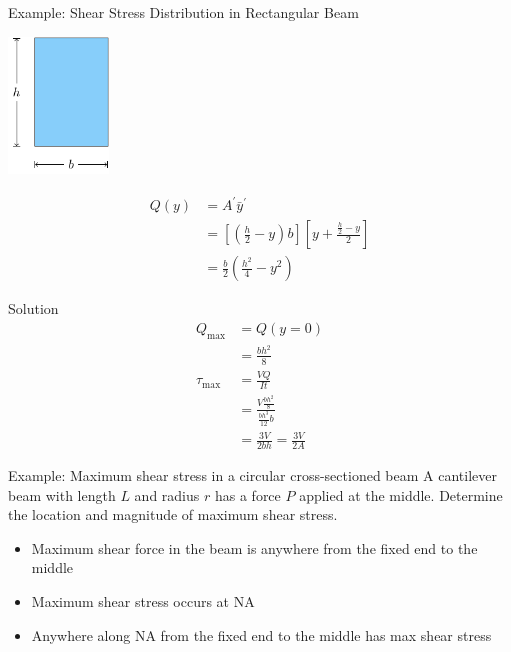 \documentclass[10pt, svgnames]{beamer}
\begin{document}
\begin{frame}[label={sec:orgc9b515d}]{Example: Shear Stress Distribution in Rectangular Beam}
\begin{center}
\includegraphics[width=0.2\textwidth]{pictures/shear-stress-example.pdf}
\end{center}

\begin{align*}
  Q(y) &= A^{\prime}\bar{y}^{\prime} \\
       &= \left[ \left( \frac{h}{2} - y \right) b \right] \left[y + \frac{\frac{h}{2} - y}{2} \right] \\
       &= \frac{b}{2} \left( \frac{h^{2}}{4} - y^{2} \right)
\end{align*}
\end{frame}

\begin{frame}[label={sec:orgc63280f}]{Solution}
\begin{align*}
  Q_{\max} &= Q(y = 0) \\
           &= \frac{bh^{2}}{8} \\
  \tau_{\max} &= \frac{VQ}{It} \\
           &= \frac{V \frac{bh^{2}}{8}}{ \frac{bh^{3}}{12} b} \\
           &= \frac{3V}{2bh}  = \frac{3V}{2A}
\end{align*}
\end{frame}

\begin{frame}[label={sec:orga4fe826}]{Example: Maximum shear stress in a circular cross-sectioned beam}
A cantilever beam with length \(L\) and radius \(r\) has a force \(P\)
applied at the middle. Determine the location and magnitude of maximum
shear stress.

\begin{itemize}
\item Maximum shear force in the beam is anywhere from the fixed end to the
middle

\item Maximum shear stress occurs at NA

\item Anywhere along NA from the fixed end to the middle has max shear
stress
\end{itemize}
\end{frame}
\end{document}
